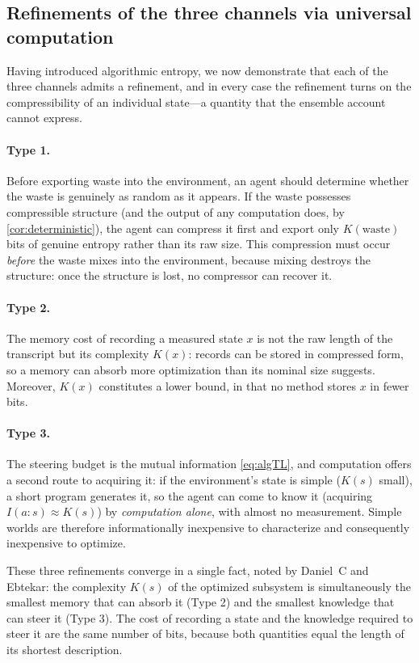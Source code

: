 \documentclass[11pt]{article}
\begin{document}
\subsection{Refinements of the three channels via universal computation}
\label{sec:typesharpen}

Having introduced algorithmic entropy, we now demonstrate that each of the three channels admits a refinement, and in every case the refinement turns on the compressibility of an individual state---a quantity that the ensemble account cannot express.

\paragraph{Type 1.} Before exporting waste into the environment, an agent should determine whether the waste is genuinely as random as it appears. If the waste possesses compressible structure (and the output of any computation does, by \cref{cor:deterministic}), the agent can compress it first and export only $K(\text{waste})$ bits of genuine entropy rather than its raw size. This compression must occur \emph{before} the waste mixes into the environment, because mixing destroys the structure: once the structure is lost, no compressor can recover it.

\paragraph{Type 2.} The memory cost of recording a measured state $x$ is not the raw length of the transcript but its complexity $K(x)$: records can be stored in compressed form, so a memory can absorb more optimization than its nominal size suggests. Moreover, $K(x)$ constitutes a lower bound, in that no method stores $x$ in fewer bits.

\paragraph{Type 3.} The steering budget is the mutual information \eqref{eq:algTL}, and computation offers a second route to acquiring it: if the environment's state is simple ($K(s)$ small), a short program generates it, so the agent can come to know it (acquiring $I(a:s) \approx K(s)$) by \emph{computation alone}, with almost no measurement. Simple worlds are therefore informationally inexpensive to characterize and consequently inexpensive to optimize.

These three refinements converge in a single fact, noted by Daniel~C and Ebtekar: the complexity $K(s)$ of the optimized subsystem is simultaneously the smallest memory that can absorb it (Type 2) and the smallest knowledge that can steer it (Type 3). The cost of recording a state and the knowledge required to steer it are the same number of bits, because both quantities equal the length of its shortest description.
\end{document}
